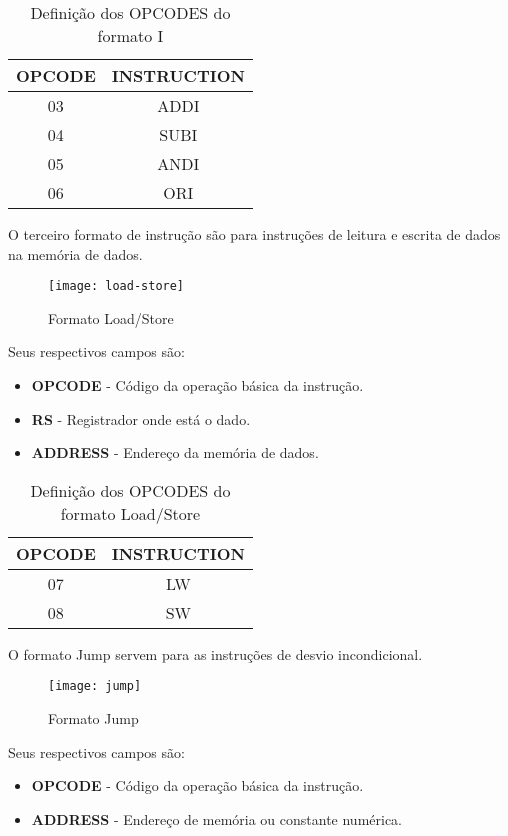 \begin{table}[H]
\centering	
\begin{tabular}{|c|c|}
	\hline 
	OPCODE & INSTRUCTION \\ 
	\hline 
	03 & ADDI \\ 
	\hline 
	04 & SUBI \\ 
	\hline 
	05 & ANDI \\ 
	\hline 
	06 & ORI \\ 
	\hline 
	\end{tabular} 
	  	\caption{Definição dos OPCODES do formato I}	
\end{table}	
	
 O terceiro formato de instrução são para instruções de leitura e escrita de dados na memória de dados.  	
  	\begin{figure}[H]
    	\centering
    	\texttt{[image: load-store]}
    	\caption{Formato Load/Store}
		\label{loadstore}
  	\end{figure}  	
Seus respectivos campos são:
	\begin{itemize}
	\item \textbf{OPCODE} - Código da operação básica da instrução.
	\item \textbf{RS} - Registrador onde está o dado.
	\item \textbf{ADDRESS} - Endereço da memória de dados.
\end{itemize}

\begin{table}[H]
\centering
\begin{tabular}{|c|c|}
\hline 
OPCODE & INSTRUCTION \\ 
\hline 
07 & LW \\ 
\hline 
08 & SW \\ 
\hline 
\end{tabular} 
  	\caption{Definição dos OPCODES do formato Load/Store}
\end{table}

 O formato Jump servem para as instruções de desvio incondicional.  	
   	\begin{figure}[H]
    	\centering
    	\texttt{[image: jump]}
    	\caption{Formato Jump}
		\label{jump}
  	\end{figure}
Seus respectivos campos são:
	\begin{itemize}
	\item \textbf{OPCODE} - Código da operação básica da instrução.
	\item \textbf{ADDRESS} - Endereço de memória ou constante numérica.
\end{itemize}
 
